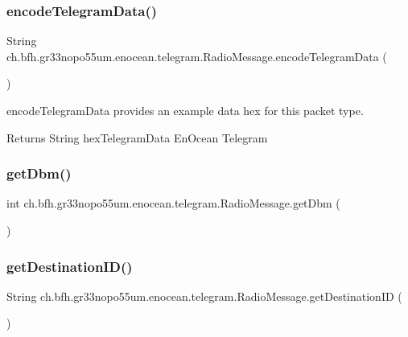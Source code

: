 \subsubsection{\texorpdfstring{encode\+Telegram\+Data()}{encodeTelegramData()}}
{\footnotesize\ttfamily String ch.\+bfh.\+gr33nopo55um.\+enocean.\+telegram.\+Radio\+Message.\+encode\+Telegram\+Data (\begin{DoxyParamCaption}{ }\end{DoxyParamCaption})}

encode\+Telegram\+Data provides an example data hex for this packet type.

\begin{DoxyReturn}{Returns}
String hex\+Telegram\+Data En\+Ocean Telegram 
\end{DoxyReturn}
\hypertarget{classch_1_1bfh_1_1gr33nopo55um_1_1enocean_1_1telegram_1_1_radio_message_a017f82807dd2b9218b500992396d0429}{}\label{classch_1_1bfh_1_1gr33nopo55um_1_1enocean_1_1telegram_1_1_radio_message_a017f82807dd2b9218b500992396d0429} 
\subsubsection{\texorpdfstring{get\+Dbm()}{getDbm()}}
{\footnotesize\ttfamily int ch.\+bfh.\+gr33nopo55um.\+enocean.\+telegram.\+Radio\+Message.\+get\+Dbm (\begin{DoxyParamCaption}{ }\end{DoxyParamCaption})}

\hypertarget{classch_1_1bfh_1_1gr33nopo55um_1_1enocean_1_1telegram_1_1_radio_message_a677622fcad169f2139dd34a83ddce8ec}{}\label{classch_1_1bfh_1_1gr33nopo55um_1_1enocean_1_1telegram_1_1_radio_message_a677622fcad169f2139dd34a83ddce8ec} 
\subsubsection{\texorpdfstring{get\+Destination\+I\+D()}{getDestinationID()}}
{\footnotesize\ttfamily String ch.\+bfh.\+gr33nopo55um.\+enocean.\+telegram.\+Radio\+Message.\+get\+Destination\+ID (\begin{DoxyParamCaption}{ }\end{DoxyParamCaption})}

